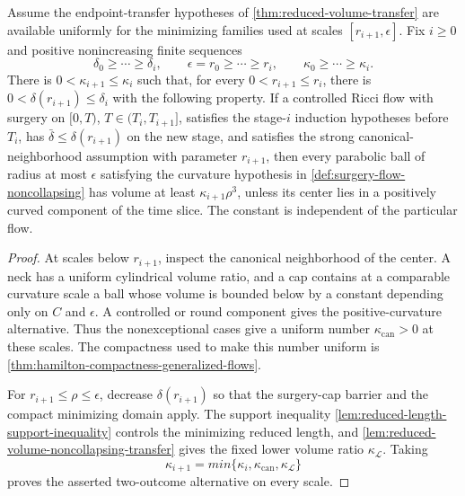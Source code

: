 \begin{theorem}
\label{thm:conditional-noncollapsing-extension}
\notready
Assume the endpoint-transfer hypotheses of \ref{thm:reduced-volume-transfer}
are available uniformly for the minimizing families used at scales
$[r_{i+1},\epsilon]$.  Fix $i\ge0$ and positive nonincreasing finite sequences
\[
 \delta_0\ge\cdots\ge\delta_i,
 \qquad \epsilon=r_0\ge\cdots\ge r_i,
 \qquad \kappa_0\ge\cdots\ge\kappa_i.
\]
There is $0<\kappa_{i+1}\le\kappa_i$ such that, for every
$0<r_{i+1}\le r_i$, there is
$0<\delta(r_{i+1})\le\delta_i$ with the following property.  If a
controlled Ricci flow with surgery on $[0,T)$,
$T\in(T_i,T_{i+1}]$, satisfies the stage-$i$ induction hypotheses before
$T_i$, has $\bar\delta\le\delta(r_{i+1})$ on the new stage, and satisfies
the strong canonical-neighborhood assumption with parameter $r_{i+1}$,
then every parabolic ball of radius at most $\epsilon$ satisfying the
curvature hypothesis in
\ref{def:surgery-flow-noncollapsing} has volume at least
$\kappa_{i+1}\rho^3$, unless its center lies in a positively curved component
of the time slice.  The constant is independent of the particular flow.
\end{theorem}

\begin{proof}
At scales below $r_{i+1}$, inspect the canonical neighborhood of the center.
A neck has a uniform cylindrical volume ratio, and a cap contains at a
comparable curvature scale a ball whose volume is bounded below by a constant
depending only on $C$ and $\epsilon$.  A controlled or round component gives
the positive-curvature alternative.  Thus the nonexceptional cases give a
uniform number $\kappa_{\mathrm{can}}>0$ at these scales.  The compactness
used to make this number uniform is
\ref{thm:hamilton-compactness-generalized-flows}.

For $r_{i+1}\le\rho\le\epsilon$, decrease
$\delta(r_{i+1})$ so that the surgery-cap barrier and the compact minimizing
domain apply.  The support inequality
\ref{lem:reduced-length-support-inequality} controls the minimizing reduced
length, and \ref{lem:reduced-volume-noncollapsing-transfer} gives the fixed
lower volume ratio $\kappa_{\mathcal L}$.  Taking
\[
 \kappa_{i+1}=min\{\kappa_i,\kappa_{\mathrm{can}},
                         \kappa_{\mathcal L}\}
\]
proves the asserted two-outcome alternative on every scale.
\end{proof}

